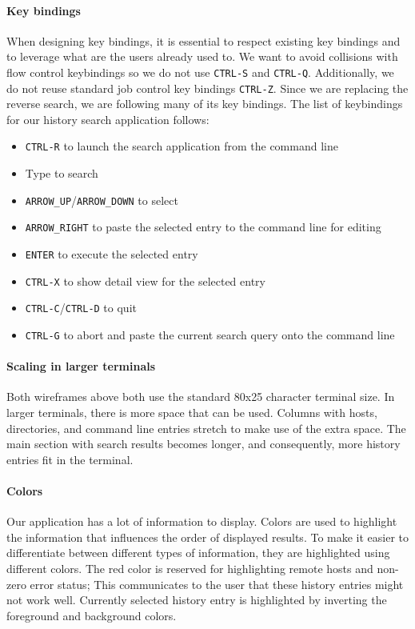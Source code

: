 \paragraph{Key bindings}
When designing key bindings, it is essential to respect existing key bindings and to leverage what are the users already used to.
We want to avoid collisions with flow control keybindings so we do not use \verb|CTRL-S| and \verb|CTRL-Q|. Additionally, we do not reuse standard job control key bindings \verb|CTRL-Z|. 
Since we are replacing the reverse search, we are following many of its key bindings. The list of keybindings for our history search application follows:

\begin{itemize}
\item \verb|CTRL-R| to launch the search application from the command line
\item Type to search
\item \verb|ARROW_UP|/\verb|ARROW_DOWN| to select 
\item \verb|ARROW_RIGHT| to paste the selected entry to the command line for editing
\item \verb|ENTER| to execute the selected entry
\item \verb|CTRL-X| to show detail view for the selected entry
\item \verb|CTRL-C|/\verb|CTRL-D| to quit
\item \verb|CTRL-G| to abort and paste the current search query onto the command line
\end{itemize}


\paragraph{Scaling in larger terminals}

Both wireframes above both use the standard 80x25 character terminal size. In larger terminals, there is more space that can be used. Columns with hosts, directories, and command line entries stretch to make use of the extra space. The main section with search results becomes longer, and consequently, more history entries fit in the terminal. 

\paragraph{Colors}

Our application has a lot of information to display. 
Colors are used to highlight the information that influences the order of displayed results. To make it easier to differentiate between different types of information, they are highlighted using different colors. 
The red color is reserved for highlighting remote hosts and non-zero error status; This communicates to the user that these history entries might not work well.
Currently selected history entry is highlighted by inverting the foreground and background colors.



